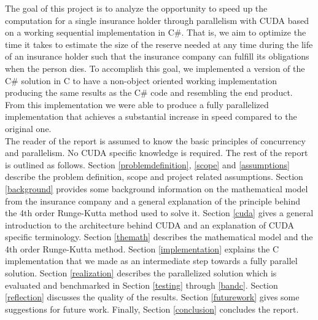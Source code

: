 The goal of this project is to analyze the opportunity to speed up the computation for a single insurance holder through parallelism with CUDA based on a working sequential implementation in C\#. That is, we aim to optimize the time it takes to estimate the size of the reserve needed at any time during the life of an insurance holder such that the insurance company can fulfill its obligations when the person dies. To accomplish this goal, we implemented a version of the C\# solution in C to have a non-object oriented working implementation producing the same results as the C\# code and resembling the end product. From this implementation we were able to produce a fully parallelized implementation that achieves a substantial increase in speed compared to the original one.\\

The reader of the report is assumed to know the basic principles of concurrency and parallelism. No CUDA specific knowledge is required. The rest of the report is outlined as follows. Section \ref{problemdefinition}, \ref{scope} and \ref{assumptions} describe the problem definition, scope and project related assumptions. Section \ref{background} provides some background information on the mathematical model from the insurance company and a general explanation of the principle behind the 4th order Runge-Kutta method used to solve it. Section \ref{cuda} gives a general introduction to the architecture behind CUDA and an explanation of CUDA specific terminology. Section \ref{themath} describes the mathematical model and the 4th order Runge-Kutta method. Section \ref{implementation} explains the C implementation that we made as an intermediate step towards a fully parallel solution. Section \ref{realization} describes the parallelized solution which is evaluated and benchmarked in Section \ref{testing} through \ref{bandc}. Section \ref{reflection} discusses the quality of the results. Section \ref{futurework} gives some suggestions for future work. Finally, Section \ref{conclusion} concludes the report.
